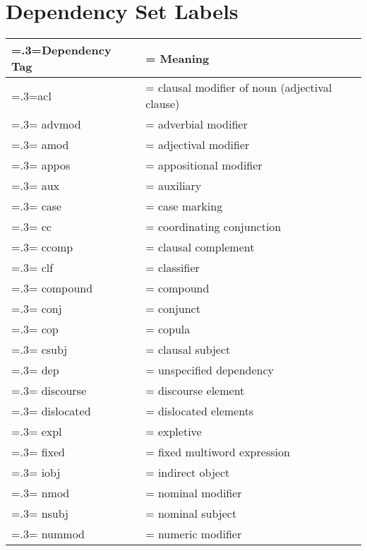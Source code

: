 
\chapter{Dependency Set Labels}

\vspace{-1em}
\begin{table}[H]
    \centering
    \renewcommand{\arraystretch}{1.0}
    \begin{tabularx}{0.8\textwidth}{|>{\hsize=.3\hsize\linewidth=\hsize}X|>{\hsize=0.7\hsize\linewidth=\hsize}X|} 
     \hline
      \textbf{Dependency Tag} & \textbf{Meaning} \\
     \hline
        acl & clausal modifier of noun (adjectival clause) \\
        \hline
        advmod & adverbial modifier \\
        \hline
        amod & adjectival modifier \\
        \hline
        appos & appositional modifier \\
        \hline
        aux & auxiliary \\
        \hline
        case & case marking \\
        \hline
        cc & coordinating conjunction \\
        \hline
        ccomp & clausal complement \\
        \hline
        clf & classifier \\
        \hline
        compound & compound \\
        \hline
        conj & conjunct \\
        \hline
        cop & copula \\
        \hline
        csubj & clausal subject \\
        \hline
        dep & unspecified dependency \\
        \hline
        discourse & discourse element \\
        \hline
        dislocated & dislocated elements \\
        \hline
        expl & expletive \\
        \hline
        fixed & fixed multiword expression \\
        \hline
        iobj & indirect object \\
        \hline
        nmod & nominal modifier \\
        \hline
        nsubj & nominal subject \\
        \hline
        nummod & numeric modifier \\

\end{tabularx}
\end{table}
